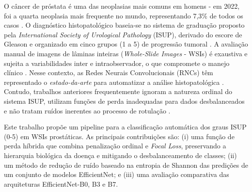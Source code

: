 O câncer de próstata é uma das neoplasias mais comuns em homens - em 2022, foi a quarta neoplasia mais frequente no mundo, representando 7,3\% de todos os casos \cite{JournalStatistic2024}. O diagnóstico histopatológico baseia-se no sistema de graduação proposto pela \textit{International Society of Urological Pathology} (ISUP), derivado do escore de Gleason e organizado em cinco grupos (1 a 5) de progressão tumoral \cite{ref-epstein2016}. A avaliação manual de imagens de lâminas inteiras (\textit{Whole-Slide Images} - WSIs) é exaustiva e sujeita a variabilidades inter e intraobservador, o que compromete o manejo clínico \cite{ref-bulten2020}. Nesse contexto, as Redes Neurais Convolucionais (RNCs) têm representado o \textit{estado-da-arte} para automatizar a análise histopatológica \cite{ref-campanella2019}. Contudo, trabalhos anteriores frequentemente ignoram a natureza ordinal do sistema ISUP, utilizam funções de perda inadequadas para dados desbalanceados e não tratam ruídos inerentes ao processo de rotulação \cite{Xiang2023Prostate,afifi2024prostate,alici2024efficient}.

Este trabalho propõe um pipeline para a classificação automática dos graus ISUP (0-5) em WSIs prostáticas. As principais contribuições são: (i) uma função de perda híbrida que combina penalização ordinal e \textit{Focal Loss}, preservando a hierarquia biológica da doença e mitigando o desbalanceamento de classes; (ii) um método de redução de ruído baseado na entropia de Shannon das predições de um conjunto de modelos EfficientNet; e (iii) uma avaliação comparativa das arquiteturas EfficientNet-B0, B3 e B7.